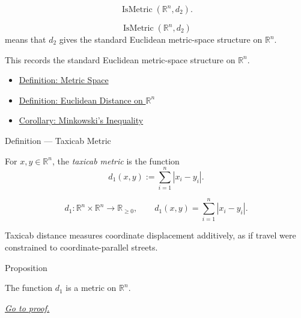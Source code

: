 \begin{remark*}
\[
\operatorname{IsMetric}(\mathbb{R}^n,d_2).
\]
\end{remark*}

\begin{remark*}
\[
\operatorname{IsMetric}(\mathbb{R}^n,d_2)
\]
means that \(d_2\) gives the standard Euclidean metric-space structure on
\(\mathbb{R}^n\).
\end{remark*}

\begin{remark*}[Interpretation]
This records the standard Euclidean metric-space structure on
\(\mathbb{R}^n\).
\end{remark*}

\begin{dependencies}
\begin{itemize}
  \item \hyperref[def:metric-space]{Definition: Metric Space}
  \item \hyperref[def:euclidean-distance-rn]{Definition: Euclidean Distance on \(\mathbb{R}^n\)}
  \item \hyperref[cor:minkowski-inequality-rn]{Corollary: Minkowski's Inequality}
\end{itemize}
\end{dependencies}

\begin{definitionbox}{Definition --- Taxicab Metric}
\begin{definition}\label{def:taxicab-metric-rn}
For \(x,y\in\mathbb{R}^n\), the \emph{taxicab metric} is the function
\[
  d_1(x,y):=\sum_{i=1}^{n}|x_i-y_i|.
\]
\end{definition}
\end{definitionbox}

\begin{remark*}
\[
d_1:\mathbb{R}^n\times\mathbb{R}^n\to\mathbb{R}_{\geq 0},
\qquad
d_1(x,y)=\sum_{i=1}^{n}|x_i-y_i|.
\]
\end{remark*}

\begin{remark*}[Interpretation]
Taxicab distance measures coordinate displacement additively, as if travel
were constrained to coordinate-parallel streets.
\end{remark*}

\DefinitionalRoot

\begin{propositionbox}{Proposition}
\begin{proposition}\label{prop:taxicab-metric-rn}
The function \(d_1\) is a metric on \(\mathbb{R}^n\).

\smallskip
\noindent
\hyperref[prf:taxicab-metric-rn]{\textit{Go to proof.}}
\end{proposition}
\end{propositionbox}

